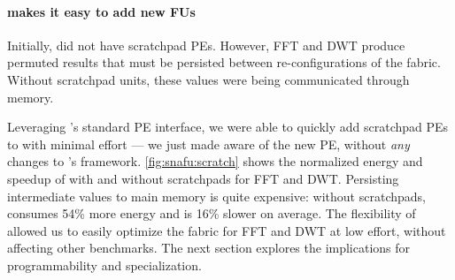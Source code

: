 \paragraph{\snafuframe makes it easy to add new FUs}
Initially, \snafuarch did not have scratchpad PEs.
%
However, FFT and DWT produce permuted results that must be persisted between re-configurations of the fabric.
%
Without scratchpad units, these values were being communicated through memory.

Leveraging \snafuframe's standard PE interface,
we were able to quickly add scratchpad PEs to \snafuarch with minimal effort --- we just made \snafuframe aware of the new PE,
without \emph{any} changes to \snafuframe's framework.
% 
\autoref{fig:snafu:scratch} shows the normalized energy and speedup of \snafuarch with and without scratchpads
for FFT and DWT.
%
Persisting intermediate values to main memory is quite expensive:
without scratchpads, \snafuarch consumes 54\% more energy and is 16\% slower on average.
% 
The flexibility of \snafuframe allowed us to easily optimize the \snafuarch fabric for FFT and DWT at low effort, without affecting other benchmarks.
%
The next section explores the implications for programmability and specialization.
